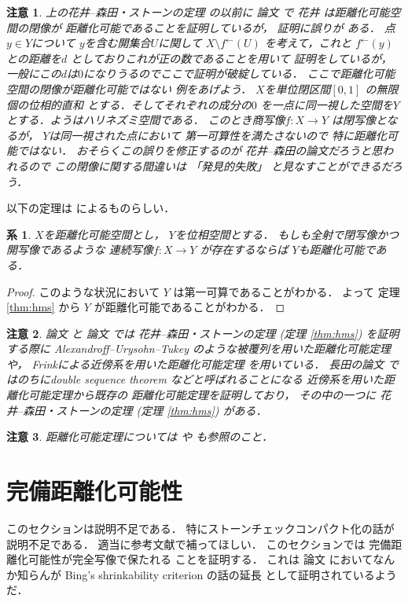 \documentclass[leqno, a4paper, 12pt]{jsarticle}
\newtheorem{cor}[thm]{系}
\newtheorem*{rmk}{注意}
\newcommand{\myinv}[1]{#1^{\gets}}
\begin{document}
\begin{rmk}
上の花井--森田・ストーンの定理
の以前に
論文
\cite{MR0064390}
で
花井
は距離化可能空間の閉像が
距離化可能であることを証明しているが，
証明に誤りが
ある．
点$y\in Y$について
$y$を含む開集合$U$に関して
$X\setminus \myinv{f}(U)$
を考えて，これと
$\myinv{f}(y)$との距離を$d$
としておりこれが正の数であることを用いて
証明をしているが，
一般にこの$d$は$0$になりうるのでここで証明が破綻している．
ここで距離化可能空間の閉像が距離化可能ではない
例をあげよう．
$X$を単位閉区間$[0, 1]$
の無限個の位相的直和
とする．そしてそれぞれの成分の$0$
を一点に同一視した空間を$Y$
とする．ようはハリネズミ空間である．
このとき商写像$f\colon X\to Y$
は閉写像となるが，
$Y$は同一視された点において
第一可算性を満たさないので
特に距離化可能ではない．
おそらくこの誤りを修正するのが
花井--森田の論文だろうと思われるので
この閉像に関する間違いは
「発見的失敗」
と見なすことができるだろう．
\end{rmk}

以下の定理は
\cite{MR0073157}
によるものらしい．

\begin{cor}
$X$を距離化可能空間とし，
$Y$を位相空間とする．
もしも全射で閉写像かつ開写像であるような
連続写像$f\colon X\to Y$
が存在するならば
$Y$も距離化可能である．
\end{cor}
\begin{proof}
このような状況において
$Y$
は第一可算であることがわかる．
よって
定理
\ref{thm:hms}
から
$Y$
が距離化可能であることがわかる．
\end{proof}


\begin{rmk}
論文
\cite{MR0087077}
と
論文
\cite{MR0087078}
では
花井--森田・ストーンの定理
(定理
\ref{thm:hms})
を証明する際に
Alexandroff--Urysohn--Tukey
のような被覆列を用いた距離化可能定理や，
Frinkによる近傍系を用いた距離化可能定理
を用いている．
長田の論文
\cite{MR0097789}
ではのちにdouble sequence theorem 
などと呼ばれることになる
近傍系を用いた距離化可能定理から既存の
距離化可能定理を証明しており，
その中の一つに
花井--森田・ストーンの定理
(定理
\ref{thm:hms})
がある．
\end{rmk}



\begin{rmk}
距離化可能定理については
\cite{MR0165490}
や
\cite{MR0370519}
も参照のこと．
\end{rmk}

\section{完備距離化可能性}
このセクションは説明不足である．
特にストーンチェックコンパクト化の話が説明不足である．
適当に参考文献で補ってほしい．
このセクションでは
完備距離化可能性が完全写像で保たれる
ことを証明する．
これは
論文
\cite{MR0388319}
においてなんか知らんが
Bing's shrinkability criterion 
の話の延長
として証明されているようだ．
\end{document}
